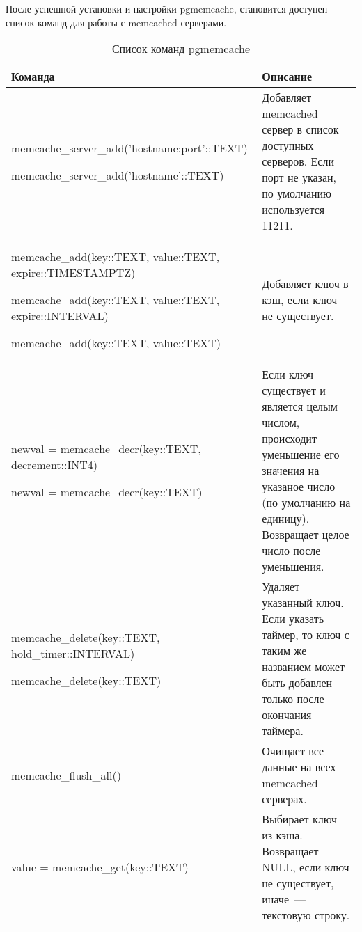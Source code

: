 После успешной установки и настройки pgmemcache, становится доступен список команд для работы с memcached серверами.

\begin{table}[h]
\caption{Список команд pgmemcache}
\label{tabular:pgmemcache1}
\begin{tabular}{| >{\raggedright\scriptsize}p{7cm}| >{\scriptsize}p{7cm} |}
\hline
Команда & Описание\\
\hline
memcache\_server\_add('hostname:port'::TEXT)

memcache\_server\_add('hostname'::TEXT)
&
Добавляет memcached сервер в список доступных серверов. Если порт не указан, по умолчанию используется 11211.\\

\hline

memcache\_add(key::TEXT, value::TEXT, expire::TIMESTAMPTZ)

memcache\_add(key::TEXT, value::TEXT, expire::INTERVAL)

memcache\_add(key::TEXT, value::TEXT)
&
Добавляет ключ в кэш, если ключ не существует.\\

\hline

newval = memcache\_decr(key::TEXT, decrement::INT4)

newval = memcache\_decr(key::TEXT)
&
Если ключ существует и является целым числом, происходит уменьшение
его значения на указаное число (по умолчанию на единицу).
Возвращает целое число после уменьшения.\\

\hline

memcache\_delete(key::TEXT, hold\_timer::INTERVAL)

memcache\_delete(key::TEXT)

&
Удаляет указанный ключ. Если указать таймер, то ключ с таким же названием может
быть добавлен только после окончания таймера.\\

\hline

memcache\_flush\_all()

&
Очищает все данные на всех memcached серверах.\\

\hline

value = memcache\_get(key::TEXT)

&
Выбирает ключ из кэша. Возвращает NULL, если ключ не существует, иначе~--- текстовую строку.\\

\hline


\end{tabular}
\end{table}
